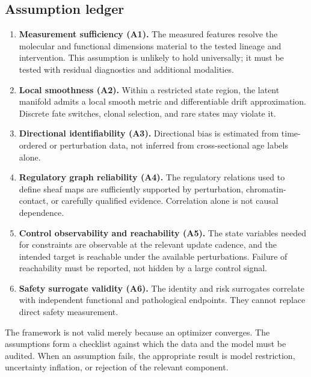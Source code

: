 \documentclass[11pt,a4paper]{article}
\theoremstyle{definition}
\theoremstyle{remark}
\begin{document}
\subsection{Assumption ledger}
\begin{enumerate}
\item \textbf{Measurement sufficiency (A1).} The measured features resolve the molecular and functional dimensions material to the tested lineage and intervention. This assumption is unlikely to hold universally; it must be tested with residual diagnostics and additional modalities.
\item \textbf{Local smoothness (A2).} Within a restricted state region, the latent manifold admits a local smooth metric and differentiable drift approximation. Discrete fate switches, clonal selection, and rare states may violate it.
\item \textbf{Directional identifiability (A3).} Directional bias is estimated from time-ordered or perturbation data, not inferred from cross-sectional age labels alone.
\item \textbf{Regulatory graph reliability (A4).} The regulatory relations used to define sheaf maps are sufficiently supported by perturbation, chromatin-contact, or carefully qualified evidence. Correlation alone is not causal dependence.
\item \textbf{Control observability and reachability (A5).} The state variables needed for constraints are observable at the relevant update cadence, and the intended target is reachable under the available perturbations. Failure of reachability must be reported, not hidden by a large control signal.
\item \textbf{Safety surrogate validity (A6).} The identity and risk surrogates correlate with independent functional and pathological endpoints. They cannot replace direct safety measurement.
\end{enumerate}

The framework is not valid merely because an optimizer converges. The assumptions form a checklist against which the data and the model must be audited. When an assumption fails, the appropriate result is model restriction, uncertainty inflation, or rejection of the relevant component.
\end{document}
